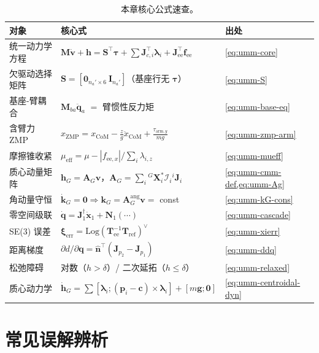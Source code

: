 \begin{table}[H]\centering\small
\caption{本章核心公式速查。}
\label{tab:umm-summary}
\begin{tabular}{lll}
\toprule
对象 & 核心式 & 出处 \\
\midrule
统一动力学方程 & $\mathbf M\dot{\mathbf v}+\mathbf h=\mathbf S^\top\boldsymbol\tau+\sum\mathbf J_{c,i}^\top\boldsymbol\lambda_i+\mathbf J_{\text{ee}}^\top\mathbf f_{\text{ee}}$ & \cref{eq:umm-core} \\
欠驱动选择矩阵 & $\mathbf S=[\mathbf 0_{n_a'\times6}\ \mathbf I_{n_a'}]$（基座行无 $\boldsymbol\tau$） & \cref{eq:umm-S} \\
基座-臂耦合 & $\mathbf M_{ba}\ddot{\mathbf q}_a$ $=$ 臂惯性反力矩 & \cref{eq:umm-base-eq} \\
含臂力 ZMP & $x_{\text{ZMP}}=x_{\text{CoM}}-\frac z g\ddot x_{\text{CoM}}+\frac{\tau_{\text{arm},y}}{m g}$ & \cref{eq:umm-zmp-arm} \\
摩擦锥收紧 & $\mu_{\text{eff}}=\mu-|f_{\text{ee},x}|/\sum_i\lambda_{i,z}$ & \cref{eq:umm-mueff} \\
质心动量矩阵 & $\mathbf h_G=\mathbf A_G\mathbf v$，$\mathbf A_G=\sum_i{}^G\mathbf X_i^*\mathcal I_i{}^i\mathbf J_i$ & \cref{eq:umm-cmm-def,eq:umm-Ag} \\
角动量守恒 & $\dot{\mathbf k}_G=\mathbf 0\Rightarrow\mathbf k_G=\mathbf A_G^{\text{ang}}\mathbf v=$ const & \cref{eq:umm-kG-cons} \\
零空间级联 & $\dot{\mathbf q}=\mathbf J_1^\dagger\dot{\mathbf x}_1+\mathbf N_1(\cdots)$ & \cref{eq:umm-cascade} \\
SE(3) 误差 & $\boldsymbol\xi_{\text{err}}=\mathrm{Log}(\mathbf T_{\text{ee}}^{-1}\mathbf T_{\text{ref}})^{\vee}$ & \cref{eq:umm-xierr} \\
距离梯度 & $\partial d/\partial\mathbf q=\hat{\mathbf n}^\top(\mathbf J_{p_2}-\mathbf J_{p_1})$ & \cref{eq:umm-ddq} \\
松弛障碍 & 对数（$h>\delta$）/ 二次延拓（$h\le\delta$） & \cref{eq:umm-relaxed} \\
质心动力学 & $\dot{\mathbf h}_G=\sum[\boldsymbol\lambda_i;(\mathbf p_i-\mathbf c)\times\boldsymbol\lambda_i]+[m\mathbf g;\mathbf 0]$ & \cref{eq:umm-centroidal-dyn} \\
\bottomrule
\end{tabular}
\end{table}

\section*{常见误解辨析}

